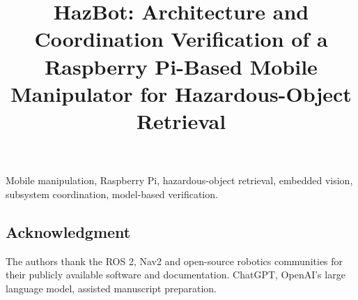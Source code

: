 \documentclass[conference,a4paper]{IEEEtran}
\begin{document}
\raggedbottom
\title{HazBot: Architecture and Coordination Verification of a Raspberry Pi-Based Mobile Manipulator for Hazardous-Object Retrieval}
\author{}
\maketitle

\begin{IEEEkeywords}
Mobile manipulation, Raspberry Pi, hazardous-object retrieval, embedded vision, subsystem coordination, model-based verification.
\end{IEEEkeywords}







\begin{samepage}
\section*{Acknowledgment}
The authors thank the ROS 2, Nav2 and open-source robotics communities for their publicly available software and documentation. ChatGPT, OpenAI's large language model, assisted manuscript preparation.
\end{samepage}


\end{document}
